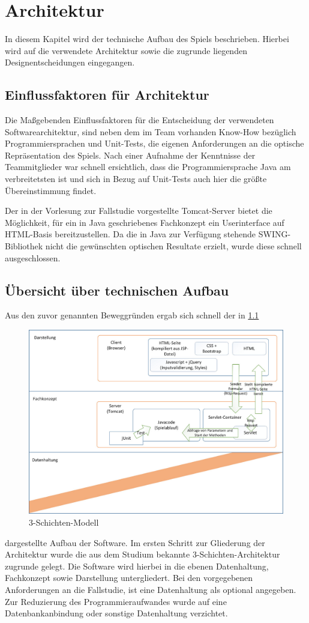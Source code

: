 \clearpage
\chapter{Architektur}
In diesem Kapitel wird der technische Aufbau des Spiels beschrieben. Hierbei wird auf die verwendete Architektur sowie die zugrunde liegenden Designentscheidungen eingegangen.

\section{Einflussfaktoren für Architektur}
Die Maßgebenden Einflussfaktoren für die Entscheidung der verwendeten Softwarearchitektur, sind neben dem im Team vorhanden Know-How bezüglich Programmiersprachen und Unit-Tests, die eigenen Anforderungen an die optische Repräsentation des Spiels. Nach einer Aufnahme der Kenntnisse der Teammitglieder war schnell ersichtlich, dass die Programmiersprache Java am verbreitetsten ist und sich in Bezug auf Unit-Tests auch hier die größte Übereinstimmung findet.

Der in der Vorlesung zur Fallstudie vorgestellte Tomcat-Server bietet die Möglichkeit, für ein in Java geschriebenes Fachkonzept ein Userinterface auf HTML-Basis bereitzustellen. Da die in Java zur Verfügung stehende SWING-Bibliothek nicht die gewünschten optischen Resultate erzielt, wurde diese schnell ausgeschlossen.

\section{Übersicht über technischen Aufbau}
Aus den zuvor genannten Beweggründen ergab sich schnell der in \ref{fig:abb} 
\begin{figure}[!h]
	\centering
	\includegraphics[scale=0.2]{img/3-schichten-modell.jpeg}
	\caption{3-Schichten-Modell} \label{fig:abb}
\end{figure}
dargestellte Aufbau der Software. Im ersten Schritt zur Gliederung der Architektur wurde die aus dem Studium bekannte 3-Schichten-Architektur zugrunde gelegt. Die Software wird hierbei in die ebenen Datenhaltung, Fachkonzept sowie Darstellung untergliedert. Bei den vorgegebenen Anforderungen an die Fallstudie, ist eine Datenhaltung als optional angegeben. Zur Reduzierung des Programmieraufwandes wurde auf eine Datenbankanbindung oder sonstige Datenhaltung verzichtet.

